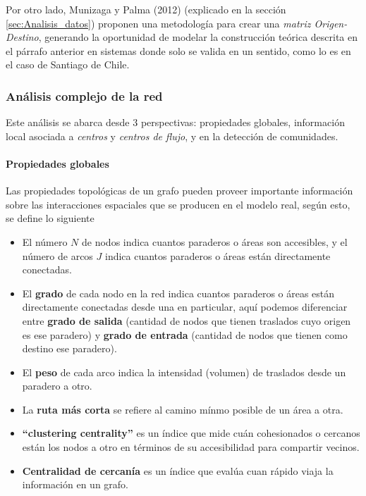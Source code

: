 \documentclass[12pt]{article}
\begin{document}
	Por otro lado, Munizaga y Palma (2012) \cite{Procesamiento_datos} (explicado en la sección \ref{sec:Analisis_datos}) proponen una metodología para crear una \textit{matriz Origen-Destino}, generando la oportunidad de modelar la construcción teórica descrita en el párrafo anterior en sistemas donde solo se valida en un sentido, como lo es en el caso de Santiago de Chile.
	
	\subsubsection{Análisis complejo de la red}    

Este análisis se abarca desde 3 perspectivas: propiedades globales, información local asociada a \textit{centros} y \textit{centros de flujo}, y en la detección de comunidades. 

	\paragraph{Propiedades globales}

Las propiedades topológicas de un grafo pueden proveer importante información sobre las interacciones espaciales que se producen en el modelo real, según esto, se define lo siguiente

	\begin{itemize}
	
		\item El número $N$ de nodos indica cuantos paraderos o áreas son accesibles, y el número de arcos $J$ indica cuantos paraderos o áreas están directamente conectadas.
		\item El \textbf{grado} de cada nodo en la red indica cuantos paraderos o áreas están directamente conectadas desde una en particular, aquí podemos diferenciar entre \textbf{grado de salida} (cantidad de nodos que tienen traslados cuyo origen es ese paradero) y \textbf{grado de entrada} (cantidad de nodos que tienen como destino ese paradero).
		
		\item El \textbf{peso} de cada arco indica la intensidad (volumen) de traslados desde un paradero a otro.
		
		\item La \textbf{ruta más corta} se refiere al camino mínmo posible de un área a otra.
		
		\item \textbf{``clustering centrality''} es un índice que mide cuán cohesionados o cercanos están los nodos a otro en términos de su accesibilidad para compartir vecinos.

		
		\item \textbf{Centralidad de cercanía} es un índice que evalúa cuan rápido viaja la información en un grafo.

	\end{itemize}
\end{document}
